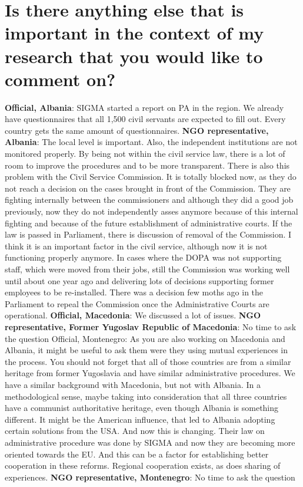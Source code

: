 \section{Is there anything else that is important in the context of my research that you would like to comment on?}
\textbf{Official, Albania}: SIGMA started a report on PA in the region. We already have questionnaires that all 1,500 civil servants are expected to fill out. Every country gets the same amount of questionnaires. 
\textbf{NGO representative, Albania}: The local level is important. Also, the independent institutions are not monitored properly. By being not within the civil service law, there is a lot of room to improve the procedures and to be more transparent. There is also this problem with the Civil Service Commission. It is totally blocked now, as they do not reach a decision on the cases brought in front of the Commission. They are fighting internally between the commissioners and although they did a good job previously, now they do not independently asses anymore because of this internal fighting and because of the future establishment of administrative courts. If the law is passed in Parliament, there is discussion of removal of the Commission. I think it is an important factor in the civil service, although now it is not functioning properly anymore. In cases where the DOPA was not supporting staff, which were moved from their jobs, still the Commission was working well until about one year ago and delivering lots of decisions supporting former employees to be re-installed. There was a decision few moths ago in the Parliament to repeal the Commission once the Administrative Courts are operational. 
\textbf{Official, Macedonia}: We discussed a lot of issues.
\textbf{NGO representative, Former Yugoslav Republic of Macedonia}: No time to ask the question
Official, Montenegro: As you are also working on Macedonia and Albania, it might be useful to ask them were they using mutual experiences in the process. You should not forget that all of those countries are from a similar heritage from former Yugoslavia and have similar administrative procedures. We have a similar background with Macedonia, but not with Albania. In a methodological sense, maybe taking into consideration that all three countries have a communist authoritative heritage, even though Albania is something different. It might be the American influence, that led to Albania adopting certain solutions from the USA. And now this is changing. Their law on administrative procedure was done by SIGMA and now they are becoming more oriented towards the EU. And this can be a factor for establishing better cooperation in these reforms. Regional cooperation exists, as does sharing of experiences.
\textbf{NGO representative, Montenegro}: No time to ask the question